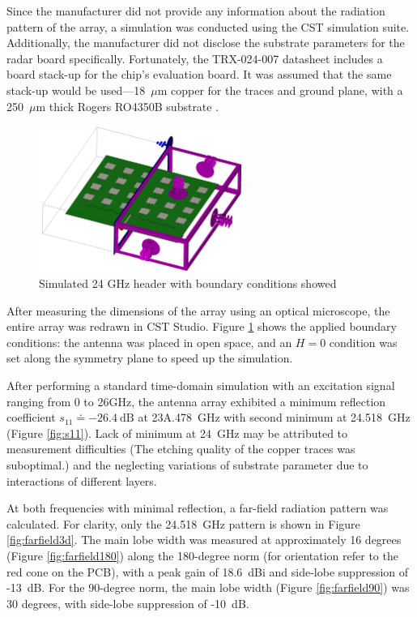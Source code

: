 Since the manufacturer did not provide any information about the radiation pattern of the array, a simulation was conducted using the CST simulation suite.
Additionally, the manufacturer did not disclose the substrate parameters for the radar board specifically.
Fortunately, the TRX-024-007 datasheet includes a board stack-up for the chip's evaluation board.
It was assumed that the same stack-up would be used—18~$\mu$m copper for the traces and ground plane, with a 250~$\mu$m thick Rogers RO4350B substrate \cite{sidarTRX24}.

\begin{figure}[ht!]
  \centering
  \includegraphics[width=0.6\textwidth]{../img/boundaries.png}
  \caption[Simulated 24 GHz header with boundary conditions showed]{Simulated 24 GHz header with boundary conditions showed}
  \label{fig:boundaries}
\end{figure}

After measuring the dimensions of the array using an optical microscope, the entire array was redrawn in CST Studio.
Figure \ref{fig:boundaries} shows the applied boundary conditions: the antenna was placed in open space, and an $H=0$ condition was set along the symmetry plane to speed up the simulation.

After performing a standard time-domain simulation with an excitation signal ranging from 0 to 26GHz, the antenna array exhibited a minimum reflection coefficient $s_{11} \doteq -26.4 \mathrm{~dB}$ at 23A.478~GHz with second minimum at 24.518~GHz (Figure \ref{fig:s11}).
Lack of minimum at 24~GHz may be attributed to measurement difficulties (The etching quality of the copper traces was suboptimal.) and the neglecting variations of substrate parameter due to interactions of different layers.

At both frequencies with minimal reflection, a far-field radiation pattern was calculated.
For clarity, only the 24.518~GHz pattern is shown in Figure \ref{fig:farfield3d}.
The main lobe width was measured at approximately 16 degrees (Figure \ref{fig:farfield180}) along the 180-degree norm (for orientation refer to the red cone on the PCB), with a peak gain of 18.6~dBi and side-lobe suppression of -13~dB.
For the 90-degree norm, the main lobe width (Figure \ref{fig:farfield90}) was 30 degrees, with side-lobe suppression of -10~dB.

